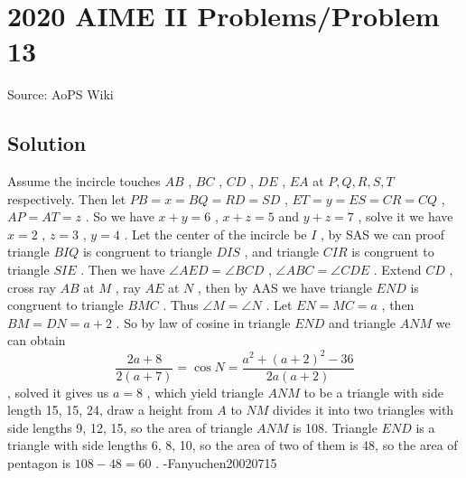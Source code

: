 \documentclass[12pt]{article}
\begin{document}
\section*{{2020 AIME II Problems/Problem 13}}
Source: AoPS Wiki

\subsection*{Solution}
Assume the incircle touches $AB$ , $BC$ , $CD$ , $DE$ , $EA$ at $P,Q,R,S,T$ respectively. Then let $PB=x=BQ=RD=SD$ , $ET=y=ES=CR=CQ$ , $AP=AT=z$ . So we have $x+y=6$ , $x+z=5$ and $y+z=7$ , solve it we have $x=2$ , $z=3$ , $y=4$ . Let the center of the incircle be $I$ , by SAS we can proof triangle $BIQ$ is congruent to triangle $DIS$ , and triangle $CIR$ is congruent to triangle $SIE$ . Then we have $\angle AED=\angle BCD$ , $\angle ABC=\angle CDE$ . Extend $CD$ , cross ray $AB$ at $M$ , ray $AE$ at $N$ , then by AAS we have triangle $END$ is congruent to triangle $BMC$ . Thus $\angle M=\angle N$ . Let $EN=MC=a$ , then $BM=DN=a+2$ . So by law of cosine in triangle $END$ and triangle $ANM$ we can obtain \[\frac{2a+8}{2(a+7)}=\cos N=\frac{a^2+(a+2)^2-36}{2a(a+2)}\] , solved it gives us $a=8$ , which yield triangle $ANM$ to be a triangle with side length 15, 15, 24, draw a height from $A$ to $NM$ divides it into two triangles with side lengths 9, 12, 15, so the area of triangle $ANM$ is 108. Triangle $END$ is a triangle with side lengths 6, 8, 10, so the area of two of them is 48, so the area of pentagon is $108-48=\boxed{60}$ . -Fanyuchen20020715
\end{document}

